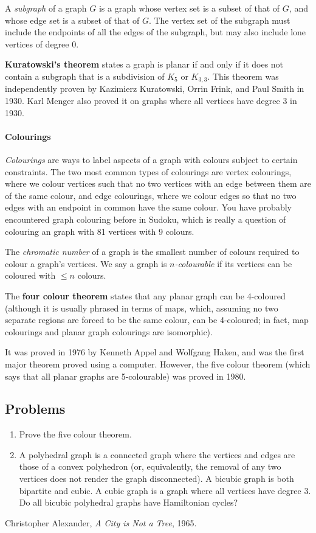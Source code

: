 	A \textit{subgraph} of a graph \(G\) is a graph whose vertex set is a subset of that of \(G\), and whose edge set is a subset of that of \(G\). The vertex set of the subgraph must include the endpoints of all the edges of the subgraph, but may also include lone vertices of degree 0.
	
	\textbf{Kuratowski's theorem} states a graph is planar if and only if it does not contain a subgraph that is a subdivision of \(K_5\) or \(K_{3,3}\). This theorem was independently proven by Kazimierz Kuratowski, Orrin Frink, and Paul Smith in 1930. Karl Menger also proved it on graphs where all vertices have degree 3 in 1930.
	
	\paragraph{Colourings}
	
	\textit{Colourings} are ways to label aspects of a graph with colours subject to certain constraints. The two most common types of colourings are vertex colourings, where we colour vertices such that no two vertices with an edge between them are of the same colour, and edge colourings, where we colour edges so that no two edges with an endpoint in common have the same colour. You have probably encountered graph colouring before in Sudoku, which is really a question of colouring an graph with 81 vertices with 9 colours.
	
	The \textit{chromatic number} of a graph is the smallest number of colours required to colour a graph's vertices. We say a graph is \textit{\(n\)-colourable} if its vertices can be coloured with \(\leq{}n\) colours.
	
	The \textbf{four colour theorem} states that any planar graph can be 4-coloured (although it is usually phrased in terms of maps, which, assuming no two separate regions are forced to be the same colour, can be 4-coloured; in fact, map colourings and planar graph colourings are isomorphic).
	
	It was proved in 1976 by Kenneth Appel and Wolfgang Haken, and was the first major theorem proved using a computer. However, the five colour theorem (which says that all planar graphs are 5-colourable) was proved in 1980.
	
	\subsection{Problems}
	
	\begin{enumerate}
		\item Prove the five colour theorem.
		\item A polyhedral graph is a connected graph where the vertices and edges are those of a convex polyhedron (or, equivalently, the removal of any two vertices does not render the graph disconnected). A bicubic graph is both bipartite and cubic. A cubic graph is a graph where all vertices have degree 3. Do all bicubic polyhedral graphs have Hamiltonian cycles?
	\end{enumerate}
		
	\begin{thebibliography}{9}
		Christopher Alexander,
		\textit{A City is Not a Tree},
		1965.
	\end{thebibliography}
	